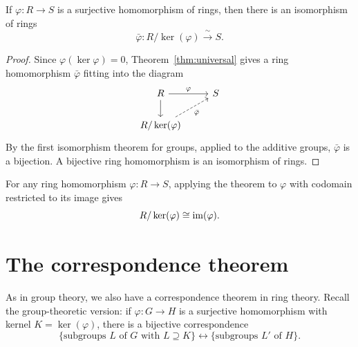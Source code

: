 \documentclass[reqno,11pt]{amsart}
\begin{document}
\begin{theorem}\label{thm:first-iso}
If $\varphi:R\to S$ is a surjective homomorphism of rings, then
there is an isomorphism of rings
\[
  \bar\varphi:R/\ker(\varphi)\xrightarrow{\ \sim\ }S.
\]
\end{theorem}
\begin{proof}
Since $\varphi(\ker\varphi)=0$, Theorem~\ref{thm:universal} gives a
ring homomorphism $\bar\varphi$ fitting into the diagram
\[
  \begin{tikzcd}
    R \arrow[r,"\varphi"] \arrow[d] & S\\
    R/\ker(\varphi) \arrow[ur,dashed,"\bar\varphi"'] &
  \end{tikzcd}
\]
By the first isomorphism theorem for groups, applied to the
additive groups, $\bar\varphi$ is a bijection. A bijective ring
homomorphism is an isomorphism of rings.
\end{proof}

For any ring homomorphism $\varphi:R\to S$, applying the theorem to
$\varphi$ with codomain restricted to its image gives
\[
  R/\ker(\varphi)\cong\operatorname{im}(\varphi).
\]

\section{The correspondence theorem}

As in group theory, we also have a correspondence theorem in ring
theory. Recall the group-theoretic version: if $\varphi:G\to H$ is a
surjective homomorphism with kernel $K=\ker(\varphi)$, there is a
bijective correspondence
\[
  \{\text{subgroups }L\text{ of }G\text{ with }L\supseteq K\}
  \longleftrightarrow
  \{\text{subgroups }L'\text{ of }H\}.
\]
\end{document}
